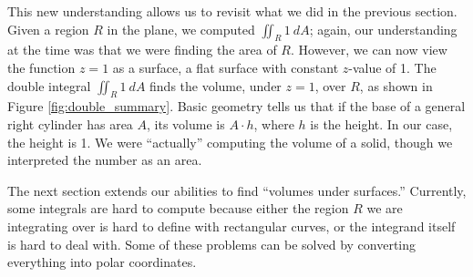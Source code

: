 This new understanding allows us to revisit what we did in the previous section. Given a region $R$ in the plane, we computed $\iint_R 1\ dA$; again, our understanding at the time was that we were finding the area of $R$. However, we can now view the function $z=1$ as a surface, a flat surface with constant $z$-value of 1. The double integral $\iint_R 1\ dA$ finds the volume, under $z=1$, over $R$, as shown in Figure \ref{fig:double_summary}. Basic geometry tells us that if the base of a general right cylinder has area $A$, its volume is $A\cdot h$, where $h$ is the height. In our case, the height is 1. We were ``actually'' computing the volume of a solid, though we interpreted the number as an area.

The next section extends our abilities to find ``volumes under surfaces.'' Currently, some integrals are hard to compute because either the region $R$ we are integrating over is hard to define with rectangular curves, or the integrand itself is hard to deal with. Some of these problems can be solved by converting everything into polar coordinates.




